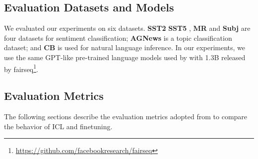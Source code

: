 \subsection{Evaluation Datasets and Models}

We evaluated our experiments on six datasets. \textbf{SST2} \cite{socher-etal-2013-recursive} \textbf{SST5} \cite{socher-etal-2013-recursive}, \textbf{MR} \cite{10.3115/1219840.1219855} and \textbf{Subj} \cite{10.3115/1218955.1218990} are four datasets for sentiment classification; \textbf{AGNews} \cite{NIPS2015_250cf8b5} is a topic classification dataset; and \textbf{CB} \cite{Marneffe2019TheCI} is used
for natural language inference.
In our experiments, we use the same GPT-like pre-trained language models used by \cite{dai2023gpt} with 1.3B released by fairseq\footnote{\url{https://github.com/facebookresearch/fairseq}}. 

\subsection{Evaluation Metrics}

The following sections describe the evaluation metrics adopted from \cite{dai2023gpt} to compare the behavior of ICL and finetuning.


